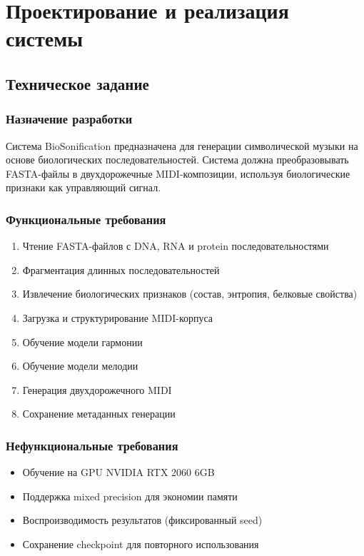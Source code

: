 \chapter{Проектирование и реализация системы}

\section{Техническое задание}

\subsection{Назначение разработки}

Система BioSonification предназначена для генерации символической музыки на основе биологических последовательностей. Система должна преобразовывать FASTA-файлы в двухдорожечные MIDI-композиции, используя биологические признаки как управляющий сигнал.

\subsection{Функциональные требования}

\begin{enumerate}
\item Чтение FASTA-файлов с DNA, RNA и protein последовательностями
\item Фрагментация длинных последовательностей
\item Извлечение биологических признаков (состав, энтропия, белковые свойства)
\item Загрузка и структурирование MIDI-корпуса
\item Обучение модели гармонии
\item Обучение модели мелодии
\item Генерация двухдорожечного MIDI
\item Сохранение метаданных генерации
\end{enumerate}

\subsection{Нефункциональные требования}

\begin{itemize}
\item Обучение на GPU NVIDIA RTX 2060 6GB
\item Поддержка mixed precision для экономии памяти
\item Воспроизводимость результатов (фиксированный seed)
\item Сохранение checkpoint для повторного использования
\end{itemize}

